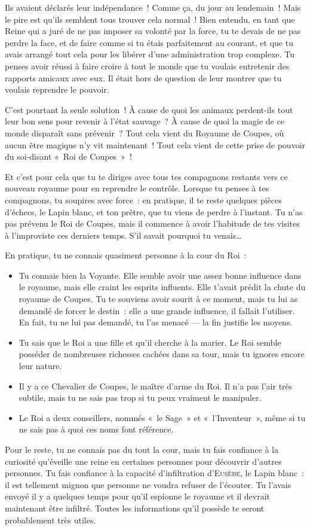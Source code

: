 {{Ils avaient déclarés leur indépendance~!
Comme ça, du jour au lendemain~!
Mais le pire est qu’ils semblent tous trouver cela normal~!
Bien entendu, en tant que Reine qui a juré de ne pas imposer sa volonté par la force, tu te devais de ne pas perdre la face, et de faire comme si tu étais parfaitement au courant, et que tu avais arrangé tout cela pour les libérer d’une administration trop complexe.
Tu penses avoir réussi à faire croire à tout le monde que tu voulais entretenir des rapports amicaux avec eux.
Il était hors de question de leur montrer que tu voulais reprendre le pouvoir.

C’est pourtant la seule solution~!
À cause de quoi les animaux perdent-ils tout leur bon sens pour revenir à l’état sauvage~?
À cause de quoi la magie de ce monde disparaît sans prévenir~?
Tout cela vient du Royaume de Coupes, où aucun être magique n’y vit maintenant~!
Tout cela vient de cette prise de pouvoir du soi-disant «~Roi de Coupes~»~!

Et c’est pour cela que tu te diriges avec tous tes compagnons restants vers ce nouveau royaume pour en reprendre le contrôle.
Lorsque tu penses à tes compagnons, tu soupires avec force~:  en pratique, il te reste quelques pièces d’échecs, le Lapin blanc, et ton prêtre, que tu viens de perdre à l’instant.
Tu n’as pas prévenu le Roi de Coupes, mais il commence à avoir l’habitude de tes visites à l’improviste ces derniers temps.
S’il savait pourquoi tu venais…

En pratique, tu ne connais quasiment personne à la cour du Roi~:
\begin{itemize}
\item Tu connais bien la Voyante.  Elle semble avoir une assez bonne influence dans le royaume, mais elle craint les esprits influents.
	Elle t’avait prédit la chute du royaume de Coupes.
	Tu te souviens avoir sourit à ce moment, mais tu lui as demandé de forcer le destin~:  elle a une grande influence, il fallait l’utiliser.
	En fait, tu ne lui pas demandé, tu l’as menacé — la fin justifie les moyens.
\item Tu sais que le Roi a une fille et qu’il cherche à la marier.
	Le Roi semble posséder de nombreuses richesses cachées dans sa tour, mais tu ignores encore leur nature.
\item Il y a ce Chevalier de Coupes, le maître d’arme du Roi.
	Il n’a pas l’air très subtile, mais tu ne sais pas trop si tu peux vraiment le manipuler.
\item Le Roi a deux conseillers, nommés «~le Sage~» et «~l’Inventeur~», même si tu ne sais pas à quoi ces noms font référence.
\end{itemize}
Pour le reste, tu ne connais pas du tout la cour, mais tu fais confiance à la curiosité qu’éveille une reine en certaines personnes pour découvrir d’autres personnes.
Tu fais confiance à la capacité d’infiltration d’\textsc{Eusèbe}, le Lapin blanc~:  il est tellement mignon que personne ne voudra refuser de l’écouter.
Tu l’avais envoyé il y a quelques temps pour qu’il espionne le royaume et il devrait maintenant être infiltré.
Toutes les informations qu’il possède te seront probablement très utiles.

}}
